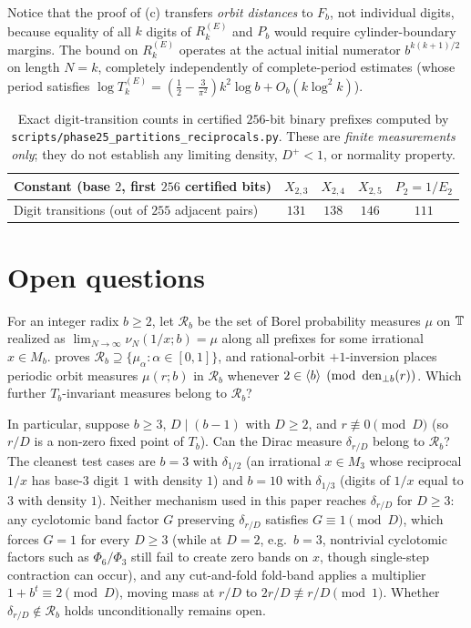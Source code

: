 \documentclass[11pt]{article}
\begin{document}
Notice that the proof of (c) transfers \emph{orbit distances} to $F_b$, not individual digits, because equality of all $k$ digits of $R_k^{(E)}$ and $P_b$ would require cylinder-boundary margins. The bound on $R_k^{(E)}$ operates at the actual initial numerator $b^{k(k+1)/2}$ on length $N=k$, completely independently of complete-period estimates (whose period satisfies $\log T_k^{(E)}=(\frac12-\frac{3}{\pi^2})k^2\log b+O_b(k\log^2 k)$).

\begin{table}[ht]
\centering\small
\begin{tabular}{@{}lcccc@{}}
\toprule
Constant (base $2$, first $256$ certified bits) & $X_{2,3}$ & $X_{2,4}$ & $X_{2,5}$ & $P_2=1/E_2$ \\
\midrule
Digit transitions (out of $255$ adjacent pairs) & $131$ & $138$ & $146$ & $111$ \\
\bottomrule
\end{tabular}
\caption{Exact digit-transition counts in certified $256$-bit binary prefixes computed by \nolinkurl{scripts/phase25_partitions_reciprocals.py}. These are \emph{finite measurements only}; they do not establish any limiting density, $D^+<1$, or normality property.}\label{tab:finite-meas}
\end{table}

\section{Open questions}\label{sec:questions}

\begin{question}\label{q:dirac}
For an integer radix $b\ge2$, let $\mathcal{R}_b$ be the set of Borel probability measures $\mu$ on $\mathbb T$ realized as $\lim_{N\to\infty}\nu_N(1/x;b)=\mu$ along all prefixes for some irrational $x\in M_b$.  proves $\mathcal{R}_b\supseteq\{\mu_\alpha:\alpha\in[0,1]\}$, and rational-orbit $+1$-inversion \cite{PaperXIII} places periodic orbit measures $\mu(r;b)$ in $\mathcal{R}_b$ whenever $2\in\langle b\rangle\pmod{\operatorname{den}_{\perp b}(r)}$. Which further $T_b$-invariant measures belong to $\mathcal{R}_b$?

In particular, suppose $b\ge3$, $D\mid(b-1)$ with $D\ge2$, and $r\not\equiv0\pmod D$ (so $r/D$ is a non-zero fixed point of $T_b$). Can the Dirac measure $\delta_{r/D}$ belong to $\mathcal{R}_b$? The cleanest test cases are $b=3$ with $\delta_{1/2}$ (an irrational $x\in M_3$ whose reciprocal $1/x$ has base-$3$ digit $1$ with density $1$) and $b=10$ with $\delta_{1/3}$ (digits of $1/x$ equal to $3$ with density $1$). Neither mechanism used in this paper reaches $\delta_{r/D}$ for $D\ge3$: any cyclotomic band factor $G$ preserving $\delta_{r/D}$ satisfies $G\equiv1\pmod D$, which forces $G=1$ for every $D\ge3$ (while at $D=2$, e.g.\ $b=3$, nontrivial cyclotomic factors such as $\Phi_6/\Phi_3$ still fail to create zero bands on $x$, though single-step contraction can occur), and any cut-and-fold fold-band applies a multiplier $1+b^t\equiv2\pmod D$, moving mass at $r/D$ to $2r/D\not\equiv r/D\pmod1$. Whether $\delta_{r/D}\notin\mathcal{R}_b$ holds unconditionally remains open.
\end{question}
\end{document}
